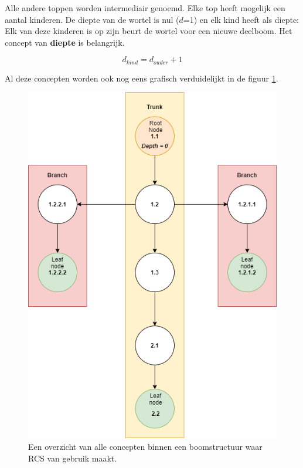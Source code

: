 Alle andere toppen worden intermediair genoemd. Elke top heeft mogelijk een aantal kinderen. De diepte van de wortel is nul ($d$=1) en elk kind heeft als diepte: Elk van deze kinderen is op zijn beurt de wortel voor een nieuwe deelboom. Het concept van \textbf{diepte} is belangrijk. 

\begin{equation}
	d_{kind} = d_{ouder} + 1
\end{equation}

Al deze concepten worden ook nog eens grafisch verduidelijkt in de figuur \ref{fig_tree}.

\begin{figure}[h!]
\centering
\includegraphics[scale=0.5]{tree1.png}
\caption[Overzicht concepten boomstructuur]{Een overzicht van alle concepten binnen een boomstructuur waar RCS van gebruik maakt.}\label{fig_tree}
\end{figure}

